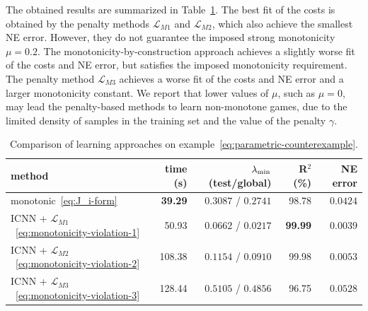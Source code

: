 \documentclass[11pt, a4paper]{article}
\renewcommand{\arraystretch}{1.3}
\newcommand{\LL}{\mathcal{L}}
\theoremstyle{remark}
\theoremstyle{plain}
\begin{document}
The obtained results are summarized in Table~\ref{tab:counterexample}. The best fit of the costs is obtained by the penalty methods $\LL_{M1}$ and $\LL_{M2}$, which also achieve the smallest NE error. However, they do not guarantee the imposed strong monotonicity $\mu=0.2$. The monotonicity-by-construction approach achieves a slightly worse fit of the costs and NE error, but satisfies the imposed monotonicity requirement. The penalty method $\LL_{M3}$ achieves a worse fit of the costs and NE error and a larger monotonicity constant. 
We report that lower values of $\mu$, such as $\mu=0$, may lead the penalty-based methods to learn non-monotone games, due to the limited density of samples in the training set and the value of the penalty $\gamma$.

\begin{table}[t]
  \centering
  \setlength{\tabcolsep}{5pt}
  \renewcommand{\arraystretch}{1.} %
   \begin{tabular}{l|rrrr}
  \hline
  method & time (s) & $\lambda_{\rm min}$ (test/global) & R$^2$ (\%) & NE error \\
  \hline
  monotonic~\eqref{eq:J_i-form} & \textbf{39.29} & $0.3087$ / $0.2741$ & 98.78 & $0.0424$ \\
  ICNN + $\LL_{M1}$~\eqref{eq:monotonicity-violation-1} & 50.93 & $0.0662$ / $0.0217$ & \textbf{99.99} & $\mathbf{0.0039}$ \\
  ICNN + $\LL_{M2}$~\eqref{eq:monotonicity-violation-2} & 108.38 & $0.1154$ / $0.0910$ & 99.98 & $0.0053$ \\
  ICNN + $\LL_{M3}$~\eqref{eq:monotonicity-violation-3} & 128.44 & $\mathbf{0.5105}$ / $\mathbf{0.4856}$ & 96.75 & $0.0528$ \\
  \hline
  \end{tabular}
  \caption{Comparison of learning approaches on example~\eqref{eq:parametric-counterexample}.}
      \label{tab:counterexample}
\end{table}
\end{document}
